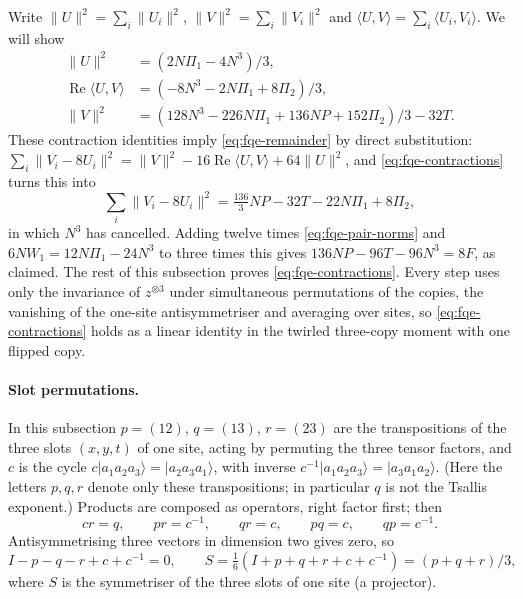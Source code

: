 Write \(\|U\|^2=\sum_i\|U_i\|^2\), \(\|V\|^2=\sum_i\|V_i\|^2\) and
\(\langle U,V\rangle=\sum_i\langle U_i,V_i\rangle\). We will show \[
\begin{aligned}
\|U\|^2&=(2N\Pi_1-4N^3)/3,\\
\operatorname{Re}\langle U,V\rangle&=(-8N^3-2N\Pi_1+8\Pi_2)/3,\\
\|V\|^2&=(128N^3-226N\Pi_1+136NP+152\Pi_2)/3-32T. \end{aligned}\tag{C}\label{eq:fqe-contractions}
\] These contraction identities imply \eqref{eq:fqe-remainder} by direct substitution:
\(\sum_i\|V_i-8U_i\|^2=\|V\|^2-16\operatorname{Re}\langle U,V\rangle+64\|U\|^2\), and
\eqref{eq:fqe-contractions} turns this into \[
\sum_i\|V_i-8U_i\|^2=\tfrac{136}{3}NP-32T-22N\Pi_1+8\Pi_2 ,
\] in which \(N^3\) has cancelled. Adding twelve times \eqref{eq:fqe-pair-norms} and \(6NW_1=12N\Pi_1-24N^3\) to three
times this gives \(136NP-96T-96N^3=8F\), as claimed. The rest of this subsection
proves \eqref{eq:fqe-contractions}. Every step uses only the invariance of $z^{\otimes3}$ under simultaneous permutations of the
copies, the vanishing of the one-site antisymmetriser and averaging over sites, so \eqref{eq:fqe-contractions} holds as a
linear identity in the twirled three-copy moment with one flipped copy.

\paragraph{Slot permutations.} In this subsection \(p=(12)\), \(q=(13)\), \(r=(23)\) are the
transpositions of the three slots \((x,y,t)\) of one site, acting by permuting the three tensor factors, and \(c\)
is the cycle \(c|a_1a_2a_3\rangle=|a_2a_3a_1\rangle\), with inverse
\(c^{-1}|a_1a_2a_3\rangle=|a_3a_1a_2\rangle\). (Here the letters \(p,q,r\) denote only these
transpositions; in particular \(q\) is not the Tsallis exponent.) Products are composed as operators, right factor first; then \[
cr=q,\qquad pr=c^{-1},\qquad qr=c,\qquad pq=c,\qquad qp=c^{-1}.
\] Antisymmetrising three vectors in dimension two gives zero, so \[
I-p-q-r+c+c^{-1}=0,\qquad S=\tfrac16(I+p+q+r+c+c^{-1})=(p+q+r)/3, \tag{A}\label{eq:fqe-antisym}
\] where \(S\) is the symmetriser of the three slots of one site (a projector).

